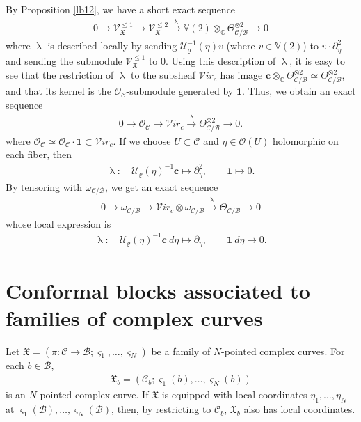 \documentclass[12pt,a4paper,notitlepage]{article}
\theoremstyle{definition}
\theoremstyle{plain}
\newcommand{\fk}{\mathfrak}
\newcommand{\mc}{\mathcal}
\newcommand{\id}{\mathbf{1}}
\newcommand{\scr}{\mathscr}
\newcommand{\sgm}{\varsigma}
\newcommand{\Vbb}{\mathbb V}
\newcommand{\Cbb}{\mathbb C}
\newcommand{\cbf}{\mathbf c}
\newcommand{\svir}{\mathcal V\!\mathit{ir}}
\numberwithin{equation}{section}
\begin{document}
By Proposition \ref{lb12}, we have a short exact sequence
\begin{align*}
0\rightarrow\scr V_{\fk X}^{\leq 1} \rightarrow\scr V_{\fk X}^{\leq 2}\xrightarrow{\uplambda}\Vbb(2)\otimes_\Cbb\Theta_{\mc C/\mc B}^{\otimes 2}\rightarrow 0
\end{align*}
where $\uplambda$ is described locally  by sending  $\mc U_\varrho^{-1}(\eta)v$ (where $v\in\Vbb(2)$) to  $v\cdot \partial_\eta^2$ and sending the submodule $\scr V_{\fk X}^{\leq 1}$ to $0$. Using this description of $\uplambda$, it is easy to see that the restriction of $\uplambda$ to the subsheaf $\svir_c$ has image $\cbf\otimes_\Cbb \Theta_{\mc C/\mc B}^{\otimes 2}\simeq \Theta_{\mc C/\mc B}^{\otimes 2}$, and that its kernel is the $\scr O_{\mc C}$-submodule generated by $\id$. Thus, we obtain an exact sequence
\begin{align}
0\rightarrow\scr O_{\mc C} \rightarrow\svir_c\xrightarrow{\uplambda}\Theta_{\mc C/\mc B}^{\otimes 2}\rightarrow 0.
\end{align}
where $\scr O_{\mc C}\simeq\scr O_{\mc C}\cdot\id\subset\svir_c$. If we choose $U\subset\mc C$ and $\eta\in\scr O(U)$ holomorphic on each fiber,  then
\begin{gather*}
\uplambda:\quad \mc U_\varrho(\eta)^{-1}\cbf\mapsto \partial_\eta^2,\qquad \id\mapsto 0.
\end{gather*}
By tensoring with $\omega_{\mc C/\mc B}$, we get an exact sequence
\begin{gather}
0\rightarrow\omega_{\mc C/\mc B} \rightarrow\svir_c\otimes \omega_{\mc C/\mc B}\xrightarrow{\uplambda} \Theta_{\mc C/\mc B}\rightarrow 0\label{eq53}
\end{gather}
whose local expression is
\begin{gather}
\uplambda:\quad \mc U_\varrho(\eta)^{-1}\cbf ~d\eta\mapsto \partial_\eta,\qquad \id ~d\eta\mapsto 0.
\end{gather}







\section{Conformal blocks associated to families of complex curves}\label{lb28}


Let $\fk X=(\pi:\mc C\rightarrow\mc B;\sgm_1,\dots,\sgm_N)$ be a family of $N$-pointed complex curves. For each $b\in\mc B$, \index{Xb@$\fk X_b$} 
\begin{align*}
\fk X_b=(\mc C_b;\sgm_1(b),\dots,\sgm_N(b))
\end{align*}
is an $N$-pointed complex curve. If $\fk X$ is equipped with local coordinates $\eta_1,\dots,\eta_N$ at $\sgm_1(\mc B),\dots,\sgm_N(\mc B)$, then, by restricting to $\mc C_b$, $\fk X_b$ also has local coordinates.
\end{document}
